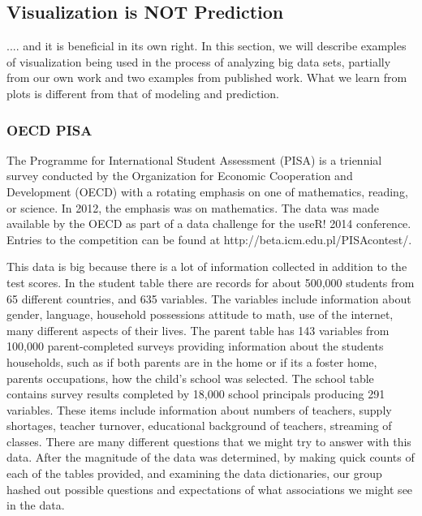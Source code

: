 \documentclass{article}
\begin{document}
\subsection{Visualization is NOT Prediction}

{\color[rgb]{1,0,0} .... and it is beneficial in its own right.} In this section, we will describe examples of visualization being used in the process of analyzing big data sets, partially from our own work and two examples from published work. What we learn from plots is different from that of modeling and prediction.


\subsubsection{OECD PISA}

The Programme for International Student Assessment (PISA) is a triennial survey conducted by the Organization for Economic Cooperation and Development (OECD) with a rotating emphasis on one of mathematics, reading, or science. In 2012, the emphasis was on mathematics. The data was made available by the OECD as part of a data challenge for the useR! 2014 conference. Entries to the competition can be found at http://beta.icm.edu.pl/PISAcontest/.

This data is big because there is a lot of information collected in addition to the test scores. In the student table there are records for about 500,000 students from 65 different countries, and 635 variables. The variables include information about gender, language, household possessions attitude to math, use of the internet, many different aspects of their lives. The parent table has 143 variables from 100,000 parent-completed surveys providing information about the students households, such as if both parents are in the home or if its a foster home, parents occupations, how the child's school was selected. The school table contains survey results completed by 18,000 school principals producing 291 variables. These items include information about numbers of teachers, supply shortages, teacher turnover, educational background of teachers, streaming of classes. There are many different questions that we might try to answer with this data. After the magnitude of the data was determined, by making quick counts of each of the tables provided, and examining the data dictionaries, our group hashed out possible questions and expectations of what associations we might see in the data.
\end{document}
